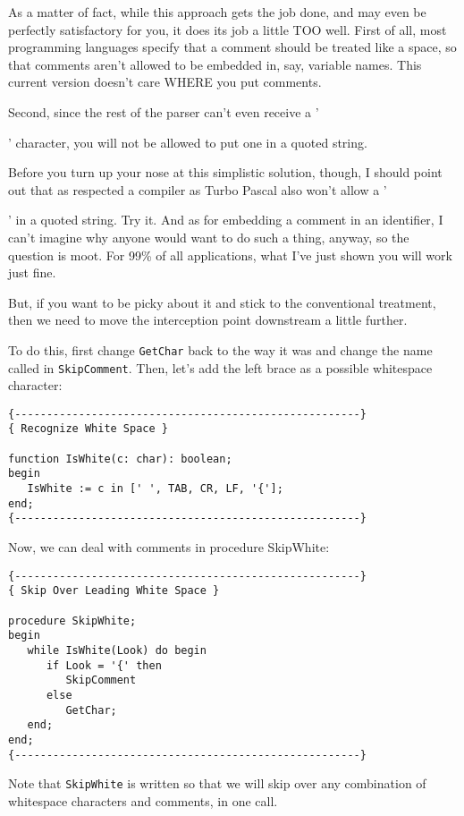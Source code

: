As a matter of fact, while  this  approach gets the job done, and may even be  perfectly  satisfactory  for  you, it does its job a little  TOO  well. First  of all, most  programming  languages specify that a comment should be treated like a  space, so  that comments aren't allowed  to  be embedded in, say, variable names. This current version doesn't care WHERE you put comments.

Second, since the  rest  of  the  parser can't even receive a '{' character, you will not be allowed to put one in a quoted string.

Before you turn up your nose at this simplistic solution, though, I should point out  that  as respected a compiler as Turbo Pascal also won't allow  a  '{' in a quoted string. Try it. And as for embedding a comment in an  identifier, I can't imagine why anyone would want to do such a  thing, anyway, so the question is moot. For 99\% of all  applications, what I've just shown you will work just fine.

But, if  you  want  to  be  picky  about it  and  stick  to  the conventional treatment, then we  need  to  move  the interception point downstream a little further.

To  do  this, first change {\tt GetChar} back to the way  it  was  and change the name called in {\tt SkipComment}. Then, let's add  the left brace as a possible whitespace character:

\begin{verbatim}
{------------------------------------------------------}
{ Recognize White Space }

function IsWhite(c: char): boolean;
begin
   IsWhite := c in [' ', TAB, CR, LF, '{'];
end;
{------------------------------------------------------}
\end{verbatim}

Now, we can deal with comments in procedure SkipWhite:

\begin{verbatim}
{------------------------------------------------------}
{ Skip Over Leading White Space }

procedure SkipWhite;
begin
   while IsWhite(Look) do begin
      if Look = '{' then
         SkipComment
      else
         GetChar;
   end;
end;
{------------------------------------------------------}
\end{verbatim}

Note  that {\tt SkipWhite} is written so that we  will  skip  over  any combination of whitespace characters and comments, in one call.

}}
